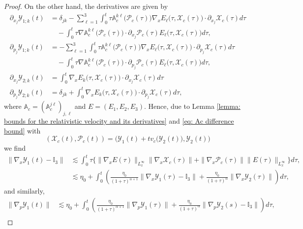 \documentclass[reqno, 11pt, letterpaper]{amsart}
\theoremstyle{remark}
\numberwithin{equation}{section}
\numberwithin{theorem}{section}
\numberwithin{table}{section}
\numberwithin{figure}{section}
\begin{document}
\begin{proof}
On the other hand, the derivatives are given by 
$$\begin{aligned}
\partial_{x_j}\mathcal{Y}_{1;k}(t)&=\delta_{jk}-\sum_{\ell=1}^3\int_0^t \tau\mathbb{A}_c^{k\ell}\big(\mathcal{P}_c(\tau)\big) \nabla_x E_\ell\big(\tau,\mathcal{X}_c(\tau)\big)\cdot\partial_{x_j}\mathcal{X}_c(\tau)d\tau\\
&\quad-\int_0^t  \tau\nabla\mathbb{A}_c^{k\ell}\big(\mathcal{P}_c(\tau)\big)\cdot\partial_{x_j}\mathcal{P}_c(\tau) E_\ell\big(\tau,\mathcal{X}_c(\tau)\big)d\tau,\\
\partial_{p_j}\mathcal{Y}_{1;k}(t)&=-\sum_{\ell=1}^3\int_0^t \tau\mathbb{A}_c^{k\ell}\big(\mathcal{P}_c(\tau)\big) \nabla_x E_\ell\big(\tau,\mathcal{X}_c(\tau)\big)\cdot\partial_{p_j}\mathcal{X}_c(\tau)d\tau\\
&\quad-\int_0^t  \tau\nabla\mathbb{A}_c^{k\ell}\big(\mathcal{P}_c(\tau)\big)\cdot\partial_{p_j}\mathcal{P}_c(\tau) E_\ell\big(\tau,\mathcal{X}_c(\tau)\big)d\tau,\\
\partial_{x_j}\mathcal{Y}_{2;k}(t)&=\int_0^t  \nabla_x E_k\big(\tau,\mathcal{X}_c(\tau)\big)\cdot\partial_{x_j}\mathcal{X}_c(\tau)d\tau\\
\partial_{p_j}\mathcal{Y}_{2;k}(t)&=\delta_{jk}+\int_0^t  \nabla_x E_k\big(\tau,\mathcal{X}_c(\tau)\big)\cdot\partial_{p_j}\mathcal{X}_c(\tau)d\tau,
\end{aligned}$$
where $\mathbb{A}_c=(\mathbb{A}_c^{j\ell})_{j,\ell}$ and $E=(E_1, E_2, E_3)$. 
Hence, due to Lemma \ref{lemma: bounds for the relativistic velocity and its derivatives} and \eqref{eq: Ac difference bound} with
$$(\mathcal{X}_c(t), \mathcal{P}_c(t))=\Big(\mathcal{Y}_1(t)+tv_c\big(\mathcal{Y}_2(t)\big), \mathcal{Y}_2(t)\Big)$$
we find
$$\begin{aligned}
\|\nabla_x\mathcal{Y}_1(t)-\mathbb{I}_3\|&\lesssim\int_0^t \tau\Big\{\|\nabla_x E(\tau)\|_{L_x^\infty}\|\nabla_x\mathcal{X}_c(\tau)\|+\|\nabla_x\mathcal{P}_c(\tau)\|\| E(\tau)\|_{L_x^\infty}\Big\}d\tau,\\
&\lesssim\eta_0+\int_0^t \left ( \frac{\eta_0}{(1+\tau)^{\alpha+1}}\|\nabla_x\mathcal{Y}_1(\tau)-\mathbb{I}_3\|+\frac{\eta_0}{(1+\tau)^\alpha}\|\nabla_x\mathcal{Y}_2(\tau)\| \right ) d\tau,
\end{aligned}$$
and similarly, 
$$\begin{aligned}
\|\nabla_p\mathcal{Y}_1(t)\|&\lesssim\eta_0+\int_0^t \left ( \frac{\eta_0}{(1+\tau)^{\alpha+1}}\|\nabla_p\mathcal{Y}_1(\tau)\|+\frac{\eta_0}{(1+\tau)^{\alpha}}\|\nabla_p\mathcal{Y}_2(s)-\mathbb{I}_3\| \right ) d\tau,\\

\end{aligned}$$
\end{proof}
\end{document}
